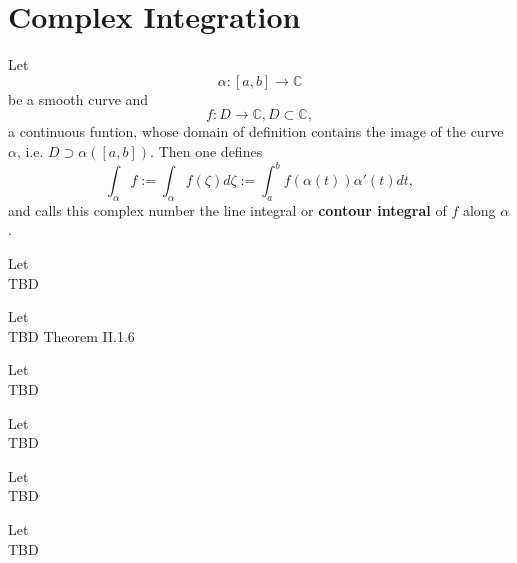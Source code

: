 \section{Complex Integration}

\begin{definition}
    \label{sec:ContourIntegral}
    Let
    $$\alpha : [a, b] \rightarrow \mathbb{C}$$
    be a smooth curve and
    $$f: D \rightarrow \mathbb{C}, D \subset \mathbb{C},$$
    a continuous funtion, whose domain of definition contains the image of the curve $\alpha$,
    i.e. $D \supset \alpha([a,b]).$ Then one defines
    $$ \int_\alpha f:= \int_\alpha f(\zeta) d\zeta := \int_a^b f(\alpha(t))\alpha'(t)dt,$$
    and calls this complex number the line integral or \textbf{contour integral} of $f$ along $\alpha$.
\end{definition}

\begin{theorem}
    \label{sec:EstimationT}
    Let \\
    TBD
\end{theorem}

\begin{theorem}
    \label{sec:ClosedContourT}
    Let \\
    TBD Theorem II.1.6
\end{theorem}

\begin{theorem}
    \label{sec:CauchyIF}
    Let \\
    TBD
\end{theorem}

\begin{theorem}
    \label{sec:GCauchyIF}
    Let \\
    TBD
\end{theorem}

\begin{theorem}
    \label{sec:MoreraT}
    Let \\
    TBD
\end{theorem}

\begin{theorem}
    \label{sec:LiouvilleT}
    Let \\
    TBD
\end{theorem}
